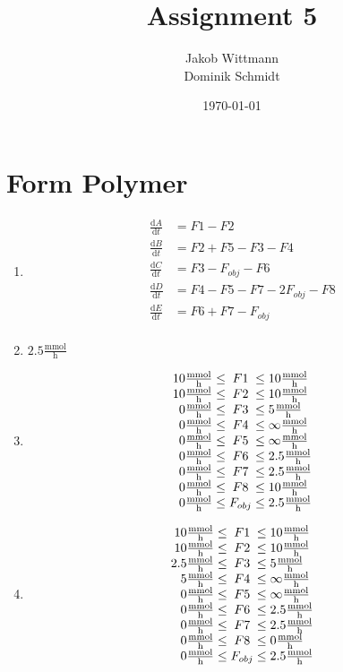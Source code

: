 \documentclass{scrartcl}
\title{Assignment 5}
\author{Jakob Wittmann\\Dominik Schmidt}
\date{\today}
\def\dd{\mathrm{d}}
\def\ml{\mathrm{\frac{mmol}{h}}}
\begin{document}
\maketitle
\section{Form Polymer}
	\begin{enumerate}
		\item 
			\begin{align}
				\frac{\dd A}{\dd t} &= F1 - F2\\
				\frac{\dd B}{\dd t} &= F2 + F5 - F3 - F4\\
				\frac{\dd C}{\dd t} &= F3 - F_{obj} - F6\\
				\frac{\dd D}{\dd t} &= F4 - F5 - F7 - 2F_{obj} - F8\\
				\frac{\dd E}{\dd t} &= F6 + F7 - F_{obj}\\
			\end{align}
		\item $2.5 \mathrm{\frac{mmol}{h}}$
		\item 
			\begin{equation*}
				\begin{array}{r@{\;\leq\;}c@{\;\leq\;}l}
					10 \ml & F1 & 10 \ml \\
					10 \ml & F2 & 10 \ml \\
					0 \ml & F3 & 5 \ml\\
					0 \ml & F4 & \infty \ml\\
					0 \ml & F5 & \infty \ml\\
					0 \ml & F6 & 2.5 \ml\\
					0 \ml & F7 & 2.5 \ml\\
					0 \ml & F8 & 10 \ml\\
					0 \ml & F_{obj} & 2.5 \ml
				\end{array}
			\end{equation*}
		\item 
			\begin{equation*}
				\begin{array}{r@{\;\leq\;}c@{\;\leq\;}l}
					10 \ml & F1 & 10 \ml \\
					10 \ml & F2 & 10 \ml \\
					2.5 \ml & F3 & 5 \ml\\
					5 \ml & F4 & \infty \ml\\
					0 \ml & F5 & \infty \ml\\
					0 \ml & F6 & 2.5 \ml\\
					0 \ml & F7 & 2.5 \ml\\
					0 \ml & F8 & 0 \ml\\
					0 \ml & F_{obj} & 2.5 \ml
				\end{array}
			\end{equation*}
	\end{enumerate}
\end{document}
